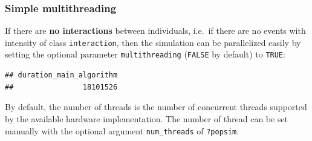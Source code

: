 \begin{Shaded}
\begin{Highlighting}[]
\OtherTok{\textless{}{-}}\NormalTok{ pop\_out[pop\_out}\SpecialCharTok{$}\SpecialCharTok{==}\NormalTok{, ]}
\OtherTok{\textless{}{-}}  \SpecialCharTok{:}\NormalTok{, } \SpecialCharTok{:}\NormalTok{)    }
\OtherTok{\textless{}{-}}  \SpecialCharTok{:}\NormalTok{, } \SpecialCharTok{:}\NormalTok{)}
\end{Highlighting}
\end{Shaded}

\hypertarget{simple-multithreading}{%
\subsubsection{Simple multithreading}\label{simple-multithreading}}

If there are \textbf{no interactions} between individuals, i.e.~if there are no events with intensity of class \texttt{interaction}, then the simulation can be parallelized easily by setting the optional parameter \texttt{multithreading} (\texttt{FALSE} by default) to \texttt{TRUE}:

\begin{Shaded}
\begin{Highlighting}[]
\OtherTok{\textless{}{-}} 
                   \NormalTok{, } \NormalTok{)}
\end{Highlighting}
\end{Shaded}

\begin{verbatim}
## duration_main_algorithm 
##                18101526
\end{verbatim}

By default, the number of threads is the number of concurrent threads supported by the available hardware implementation. The number of thread can be set manually with the optional argument \texttt{num\_threads} of \texttt{?popsim}.

